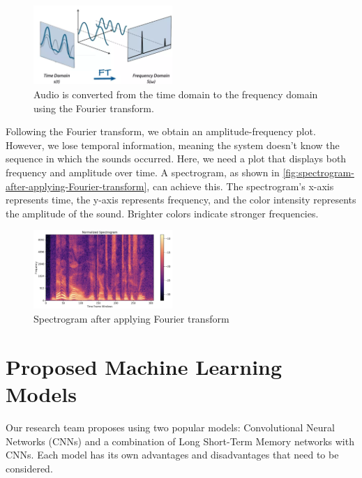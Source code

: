 \documentclass[twocolumn]{article}
\begin{document}
\begin{figure}[H]
  \centering
  \includegraphics[width=0.47\textwidth]{Audio-is-converted-from-the-time-domain-to-the-frequency-domain-using-the-Fourier-transform.png}
  \caption{Audio is converted from the time domain to the frequency domain using the Fourier transform. \cite{biswas2021fourier}}
  \label{fig:audio-is-converted-from-the-time-domain-to-the-frequency-domain-using-the-Fourier-transform}
\end{figure}

Following the Fourier transform, we obtain an amplitude-frequency plot. However, we lose
temporal information, meaning the system doesn't know the sequence in which the sounds
occurred. Here, we need a plot that displays both frequency and amplitude over time.
A spectrogram, as shown in \autoref{fig:spectrogram-after-applying-Fourier-transform}, can achieve this. The spectrogram's x-axis represents
time, the y-axis represents frequency, and the color intensity represents the amplitude
of the sound. Brighter colors indicate stronger frequencies.

\begin{figure}[H]
  \centering
  \includegraphics[width=0.47\textwidth]{Spectrogram-after-applying-Fourier-transform.png}
  \caption{Spectrogram after applying Fourier transform}
  \label{fig:spectrogram-after-applying-Fourier-transform}
\end{figure}

\section{Proposed Machine Learning Models}
Our research team proposes using two popular models: Convolutional Neural Networks
(CNNs) and a combination of Long Short-Term Memory networks with CNNs. Each model has its
own advantages and disadvantages that need to be considered.
\end{document}
